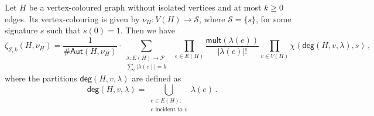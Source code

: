 \documentclass[authorcolumns,numberwithinsect]{no-lipics-v2022}
\begin{document}
\begin{theorem}\label{thm:zeta_at_most_k_edges}
Let $H$ be a vertex-coloured graph without isolated vertices and at most $k \geq 0$ edges. Its vertex-colouring is given by $\nu_H : V(H) \to \mathcal{S}$, where $\mathcal{S} = \{s\}$, for some signature $s$ such that $s(0) = 1$. Then we have
\begin{equation} \label{eqn:Theorem_general1}
    \zeta_{\mathcal{S}, k}(H,\nu_H)=\frac{1}{\#\mathsf{Aut}(H, \nu_H)} \cdot \sum_{\substack{\lambda: E(H) \to \mathcal{P}\\\sum_e |\lambda(e)| = k }}\ \  \prod_{e \in E(H)} \frac{\mathsf{mult}(\lambda(e))}{|\lambda(e)|!}  \prod_{v \in V(H)} \chi(\mathsf{deg}(H, v, \lambda), s)\,,
\end{equation}
where the partitions $\mathsf{deg}(H, v, \lambda)$ are defined as
\[
\mathsf{deg}(H, v, \lambda) = \bigcup_{\substack{e \in E(H):\\ e \text{ incident to }v}} \lambda(e)\,. 
\]
\end{theorem}
\end{document}
